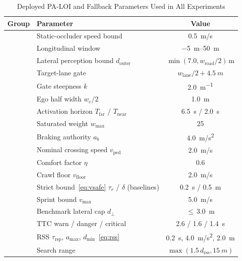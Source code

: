 \begin{table}[t]
\caption{Deployed PA-LOI and Fallback Parameters Used in All Experiments}
\label{tab:paloi-parameters}
\centering
\scriptsize
\setlength{\tabcolsep}{2.5pt}
\begin{tabular}{llc}
\toprule
Group & Parameter & Value \\
\midrule
{}
 & Static-occluder speed bound & \SI{0.5}{m/s} \\
 & Longitudinal window & \SIrange{-5}{50}{m} \\
 & Lateral perception bound $d_{\mathrm{outer}}$ & $\min(7.0, w_{\mathrm{road}}/2)$\,m \\
 & Target-lane gate & $w_{\mathrm{lane}}/2 + \SI{4.5}{m}$ \\
\midrule
{}
 & Gate steepness $k$ & \SI{2.0}{m^{-1}} \\
 & Ego half width $w_e/2$ & \SI{1.0}{m} \\
 & Activation horizon $T_{\mathrm{far}}$ / $T_{\mathrm{near}}$ & \SI{6.5}{s} / \SI{2.0}{s} \\
 & Saturated weight $w_{\max}$ & 25 \\
\midrule
{}
 & Braking authority $a_b$ & \SI{4.0}{m/s^2} \\
 & Nominal crossing speed $v_{\mathrm{ped}}$ & \SI{2.0}{m/s} \\
 & Comfort factor $\eta$ & 0.6 \\
 & Crawl floor $v_{\mathrm{floor}}$ & \SI{2.0}{m/s} \\
 & Strict bound~\eqref{eq:vsafe} $\tau_r$ / $\delta$ (baselines) & \SI{0.2}{s} / \SI{0.5}{m} \\
\midrule
{}
 & Sprint bound $v_{\max}$ & \SI{5.0}{m/s} \\
 & Benchmark lateral cap $d_\perp$ & $\le$\,\SI{3.0}{m} \\
\midrule
{}
 & TTC warn / danger / critical & 2.6 / 1.6 / \SI{1.4}{s} \\
 & RSS $\tau_{\mathrm{rsp}}$, $a_{\max}$, $d_{\min}$~\eqref{eq:rss} & \SI{0.2}{s}, \SI{4.0}{m/s^2}, \SI{2.0}{m} \\
 & Search range & $\max(1.5\,d_{\mathrm{rss}}, \SI{15}{m})$ \\

\end{tabular}
\end{table}

